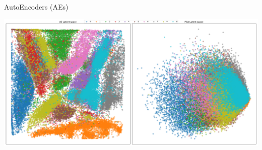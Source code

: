 \begin{frame}[allowframebreaks]{AutoEncoders (AEs)}
    \begin{center}
        \includegraphics[width=1\textwidth]{../resources/ae/mnist_latent_spaces.png}
    \end{center}


\end{frame}
